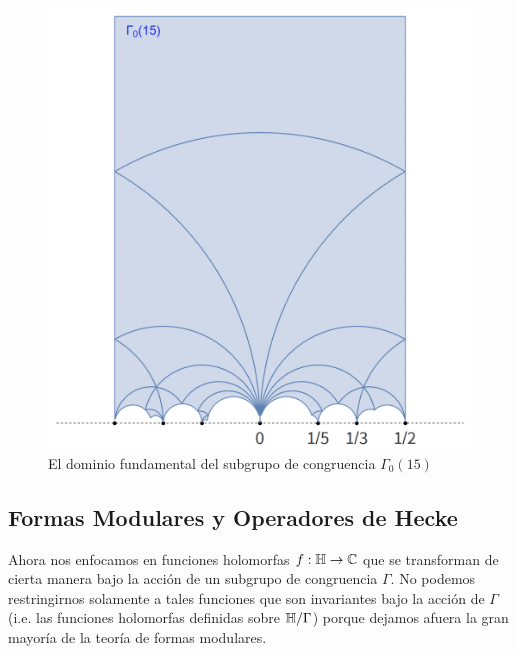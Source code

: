 \begin{figure}[!h]%
  \centering
  \includegraphics[scale=0.25]{figuras/domfundgamma015}
  \caption{El dominio fundamental del subgrupo de congruencia $\Gamma_0(15)$}
  \label{fig:domfunGamma15}
\end{figure}%













\subsection{Formas Modulares y Operadores de Hecke}%

Ahora nos enfocamos en funciones holomorfas $f:\mathbb{H}\rightarrow\mathbb{C}$ que se transforman de cierta manera bajo
la acci\'on de un subgrupo de congruencia $\Gamma$. No podemos restringirnos solamente a tales
funciones que son invariantes bajo la acci\'on de $\Gamma$ (i.e. las funciones holomorfas definidas
sobre $\mathbb{H}/\Gamma$) porque dejamos afuera la gran mayor\'ia de la teor\'ia de formas modulares.

